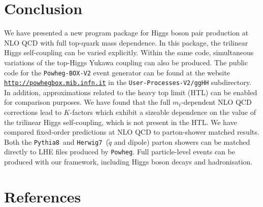 \documentclass[a4paper]{jpconf}
\newcommand{\pythia}{\texttt{Pythia8}}
\newcommand{\herwig}{\texttt{Herwig7}}
\begin{document}
\section{Conclusion}

We have presented a new program package for Higgs boson pair production at NLO QCD with full top-quark mass dependence. In this package, the trilinear Higgs self-coupling can be varied explicitly. Within the same code, simultaneous variations of the top-Higgs Yukawa coupling can also be produced. The public code for the \texttt{Powheg-BOX-V2} event generator can be found at the website \href{http://powhegbox.mib.infn.it}{\tt http://powhegbox.mib.infn.it} in the {\tt User-Processes-V2/ggHH} subdirectory. In addition, approximations related to the heavy top limit (HTL) can be enabled for comparison purposes. We have found that the full $m_t$-dependent NLO QCD corrections lead to $K$-factors which exhibit a sizeable dependence  on the value of the trilinear Higgs self-coupling, which is not present in the HTL. We have compared fixed-order predictions at NLO QCD to parton-shower matched results. Both the \pythia~and \herwig~($\tilde{q}$ and dipole) parton showers can be matched directly to LHE files produced by \texttt{Powheg}. Full particle-level events can be produced with our framework, including Higgs boson decays and hadronisation.



\section*{References}


{}
\end{document}
